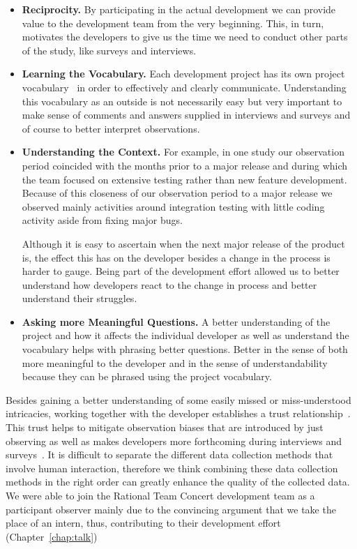 \begin{itemize}
\item\textbf{Reciprocity.} By participating in the actual development we can provide value to the development team from the very beginning.
This, in turn, motivates the developers to give us the time we need to conduct other parts of the study, like surveys and interviews.
\item\textbf{Learning the Vocabulary.} Each development project has its own project vocabulary~\cite{espinosa2007:team_knowledge} in order to effectively and clearly communicate. 
Understanding this vocabulary as an outside is not necessarily easy but very important to make sense of comments and answers supplied in interviews and surveys and of course to better interpret observations.
\item\textbf{Understanding the Context.} For example, in one study our observation period coincided with the months prior to a major release and during which the team focused on extensive testing rather than new feature development. 
Because of this closeness of our observation period to a major release we observed mainly activities around integration testing with little coding activity aside from fixing major bugs.

Although it is easy to ascertain when the next major release of the product is, the effect this has on the developer besides a change in the process is harder to gauge.
Being part of the development effort allowed us to better understand how developers react to the change in process and better understand their struggles.

\item\textbf{Asking more Meaningful Questions.} A better understanding of the project and how it affects the individual developer as well as understand the vocabulary helps with phrasing better questions.
Better in the sense of both more meaningful to the developer and in the sense of understandability because they can be phrased using the project vocabulary.
\end{itemize}

Besides gaining a better understanding of some easily missed or miss-understood intricacies, working together with the developer establishes a trust relationship~\cite{letherbridge:ese2005}.
This trust helps to mitigate observation biases that are introduced by just observing as well as makes developers more forthcoming during interviews and surveys~\cite{letherbridge:ese2005}.
It is difficult to separate the different data collection methods that involve human interaction, therefore we think combining these data collection methods in the right order can greatly enhance the quality of the collected data.
We were able to join the Rational Team Concert development team as a participant observer mainly due to the convincing argument that we take the place of an intern, thus, contributing to their development effort (Chapter~\ref{chap:talk})

